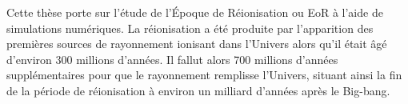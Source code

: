 %
%
Cette thèse porte sur l'étude de l'Époque de Réionisation ou \ac{EoR} à l'aide de simulations numériques.
La réionisation a été produite par l'apparition des premières sources de rayonnement ionisant dans l'Univers alors qu'il était âgé d'environ 300 millions d'années. 
Il fallut alors 700 millions d'années supplémentaires pour que le rayonnement remplisse l'Univers, situant ainsi la fin de la période de réionisation à environ un milliard d'années après le Big-bang.



